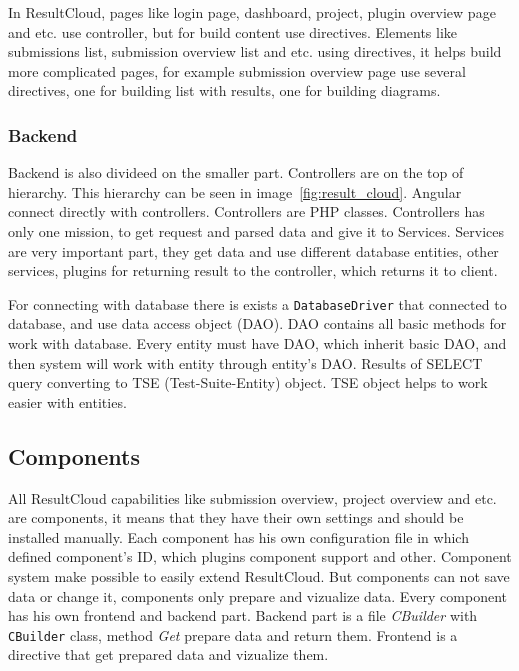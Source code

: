 In ResultCloud, pages like login page, dashboard, project, plugin overview page and etc. use controller, but for build content use directives. Elements like submissions list, submission overview list and etc. using directives, it helps build more complicated pages, for example submission overview page use several directives, one for building list with results, one for building diagrams. 

\subsubsection{Backend}

Backend is also divideed on the smaller part. Controllers are on the top of hierarchy. This hierarchy can be seen in image\ \ref{fig:result_cloud}. Angular connect directly with controllers. Controllers are PHP classes. Controllers has only one mission, to get request and parsed data and give it to Services. Services are very important part, they get data and use different database entities, other services, plugins for returning result to the controller, which returns it to client.

For connecting with database there is exists a \texttt{DatabaseDriver} that connected to database, and use data access object (DAO). DAO contains all basic methods for work with database. Every entity must have DAO, which inherit basic DAO, and then system will work with entity through entity's DAO. Results of SELECT query converting to TSE (Test-Suite-Entity) object. TSE object helps to work easier with entities.


\subsection{Components}

All ResultCloud capabilities like submission overview, project overview and etc. are components, it means that they have their own settings and should be installed manually. Each component has his own configuration file in which defined component's ID, which plugins component support and other. Component system make possible to easily extend ResultCloud. But components can not save data or change it, components only prepare and vizualize data. Every component has his own frontend and backend part. Backend part is a file \emph{CBuilder} with \texttt{CBuilder} class, method \emph{Get} prepare data and return them. Frontend is a directive that get prepared data and vizualize them.   

